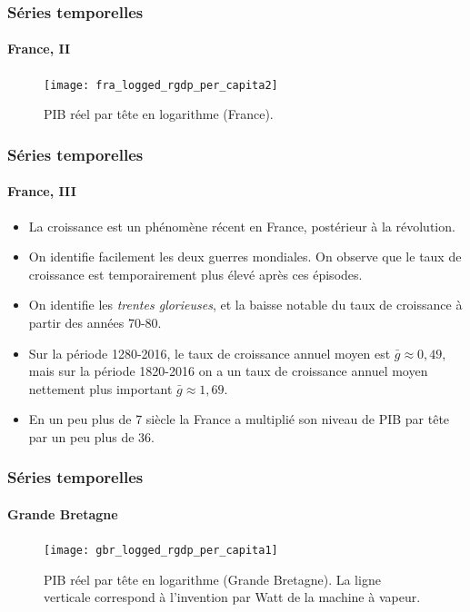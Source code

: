 \documentclass[10pt]{beamer}
\begin{document}
\begin{frame}
  \frametitle{Séries temporelles}
  \framesubtitle{France, II}
  \begin{figure}[H]
    \centering
    \texttt{[image: fra\_logged\_rgdp\_per\_capita2]}
    \caption{PIB réel par tête en logarithme (France).}
    \label{fig:maddison-rgdp-fra-2}
  \end{figure}

\end{frame}


\begin{frame}
  \frametitle{Séries temporelles}
  \framesubtitle{France, III}

  \begin{itemize}

  \item La croissance est un phénomène récent en France, postérieur à la révolution.\newline

  \item On identifie facilement les deux guerres mondiales. On observe que le taux de croissance est temporairement plus élevé après ces épisodes.\newline

  \item On identifie les \textit{trentes glorieuses}, et la baisse notable du taux de croissance à partir des années 70-80.\newline

  \item Sur la période 1280-2016, le taux de croissance annuel moyen est $\bar g \approx 0,49$, mais sur la période 1820-2016 on a un taux de croissance annuel moyen nettement plus important $\bar g \approx 1,69$.\newline

  \item En un peu plus de 7 siècle la France a multiplié son niveau de PIB par tête par un peu plus de 36.

  \end{itemize}

\end{frame}

\begin{frame}
  \frametitle{Séries temporelles}
  \framesubtitle{Grande Bretagne}
  \begin{figure}[H]
    \centering
    \texttt{[image: gbr\_logged\_rgdp\_per\_capita1]}
    \caption{PIB réel par tête en logarithme (Grande Bretagne). La ligne verticale correspond à l'invention par Watt de la machine à vapeur.}
    \label{fig:maddison-rgdp-gbr}
  \end{figure}

\end{frame}
\end{document}

